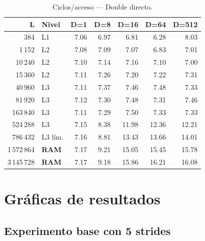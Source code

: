 \documentclass[12pt,a4paper]{article}
\newcommand{\cverde}[1]{\textcolor{verde}{#1}}
\newcommand{\cnaranja}[1]{\textcolor{naranja}{#1}}
\newcommand{\crojo}[1]{\textcolor{rojo}{#1}}
\begin{document}
\begin{table}[H]
\centering
\caption{Ciclos/acceso --- Double directo.}
\label{tab:double_dir}
\setlength{\tabcolsep}{5pt}\footnotesize
\begin{tabular}{rlrrrrr}
\toprule
\textbf{L} & \textbf{Nivel} & \textbf{D=1} & \textbf{D=8} & \textbf{D=16} & \textbf{D=64} & \textbf{D=512} \\
\midrule
384         & L1           & \cverde{7.06}  & \cverde{6.97}  & \cverde{6.81}  & \cverde{6.28}  & \cnaranja{8.03} \\
1\,152      & L2           & \cverde{7.08}  & \cverde{7.09}  & \cverde{7.07}  & \cverde{6.83}  & \cverde{7.01} \\
10\,240     & L2           & \cverde{7.10}  & \cverde{7.14}  & \cverde{7.16}  & \cverde{7.10}  & \cverde{7.00} \\
15\,360     & L2           & \cverde{7.11}  & \cverde{7.26}  & \cverde{7.20}  & \cverde{7.22}  & \cverde{7.31} \\
40\,960     & L3           & \cverde{7.11}  & \cverde{7.37}  & \cverde{7.46}  & \cverde{7.48}  & \cverde{7.33} \\
81\,920     & L3           & \cverde{7.12}  & \cverde{7.30}  & \cverde{7.48}  & \cverde{7.31}  & \cverde{7.46} \\
163\,840    & L3           & \cverde{7.11}  & \cverde{7.29}  & \cverde{7.50}  & \cverde{7.33}  & \cverde{7.33} \\
524\,288    & L3           & \cverde{7.15}  & \cnaranja{8.38} & \crojo{11.98} & \crojo{12.36}  & \crojo{12.21} \\
786\,432    & L3 lím.      & \cverde{7.16}  & \cnaranja{8.81} & \crojo{13.43} & \crojo{13.66}  & \crojo{14.01} \\
1\,572\,864 & \textbf{RAM} & \cverde{7.17}  & \cnaranja{9.21} & \crojo{15.05} & \crojo{15.45}  & \crojo{15.78} \\
3\,145\,728 & \textbf{RAM} & \cverde{7.17}  & \cnaranja{9.18} & \crojo{15.86} & \crojo{16.21}  & \crojo{16.08} \\
\bottomrule
\end{tabular}
\end{table}

\section{Gráficas de resultados}

\subsection{Experimento base con 5 strides}
\end{document}
